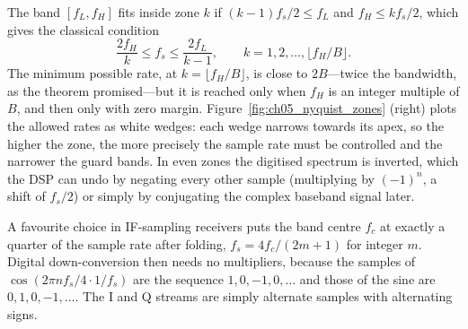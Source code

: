The band $[f_L,f_H]$ fits inside zone $k$ if $(k-1)f_s/2\le f_L$ and $f_H\le kf_s/2$, which gives
the classical condition
\begin{equation}
\frac{2f_H}{k}\le f_s\le\frac{2f_L}{k-1},\qquad k=1,2,\dots,\lfloor f_H/B\rfloor.
\label{eq:ch05:bandpass}
\end{equation}
The minimum possible rate, at $k=\lfloor f_H/B\rfloor$, is close to $2B$---twice the
bandwidth, as the theorem promised---but it is reached only when $f_H$ is an integer multiple
of $B$, and then only with zero margin. Figure~\ref{fig:ch05_nyquist_zones} (right) plots the
allowed rates as white wedges: each wedge narrows towards its apex, so the higher the zone,
the more precisely the sample rate must be controlled and the narrower the guard bands. In
even zones the digitised spectrum is inverted, which the DSP can undo by negating every other
sample (multiplying by $(-1)^n$, a shift of $f_s/2$) or simply by conjugating the complex
baseband signal later.


A favourite choice in IF-sampling receivers puts the band centre $f_c$ at exactly a quarter of
the sample rate after folding, $f_s=4f_c/(2m+1)$ for integer $m$. Digital down-conversion
then needs no multipliers, because the samples of $\cos(2\pi nf_s/4\cdot1/f_s)$ are the sequence
$1,0,-1,0,\dots$ and those of the sine are $0,1,0,-1,\dots$. The I and Q streams are simply
alternate samples with alternating signs.

